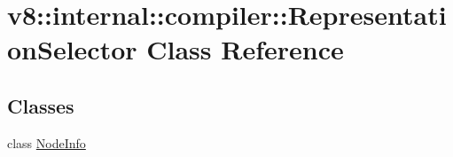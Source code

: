 \hypertarget{classv8_1_1internal_1_1compiler_1_1_representation_selector}{}\section{v8\+:\+:internal\+:\+:compiler\+:\+:Representation\+Selector Class Reference}
\label{classv8_1_1internal_1_1compiler_1_1_representation_selector}
\subsection*{Classes}
\begin{DoxyCompactItemize}
\item 
class \hyperlink{classv8_1_1internal_1_1compiler_1_1_representation_selector_1_1_node_info}{Node\+Info}
\end{DoxyCompactItemize}
